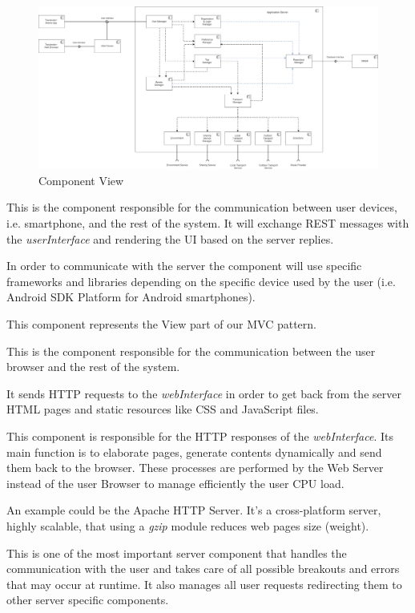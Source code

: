 \begin{figure}[H]
	\centering
	\includegraphics[scale=0.17]{Images/Architecture/Components_View}
	\caption{Component View}
\end{figure}
This is the component responsible for the communication between user devices, i.e. smartphone, and the rest of the system. It will exchange REST messages with the \emph{userInterface} and rendering the UI based on the server replies.\par
In order to communicate with the server the component will use specific frameworks and libraries depending on the specific device used by the user (i.e. Android SDK Platform for Android smartphones).\par
This component represents the View part of our MVC pattern.

This is the component responsible for the communication between the user browser and the rest of the system.\par
It sends HTTP requests to the \emph{webInterface} in order to get back from the server HTML pages and static resources like CSS and JavaScript files.

This component is responsible for the HTTP responses of the \emph{webInterface}. Its main function is to elaborate pages, generate contents dynamically and send them back to the browser. These processes are performed by the Web Server instead of the user Browser to manage efficiently the user CPU load.\par
An example could be the Apache HTTP Server. It’s a cross-platform server, highly scalable, that using a \emph{gzip} module reduces web pages size (weight).

This is one of the most important server component that handles the communication with the user and takes care of all possible breakouts and errors that may occur at runtime. It also manages all user requests redirecting them to other server specific components.

